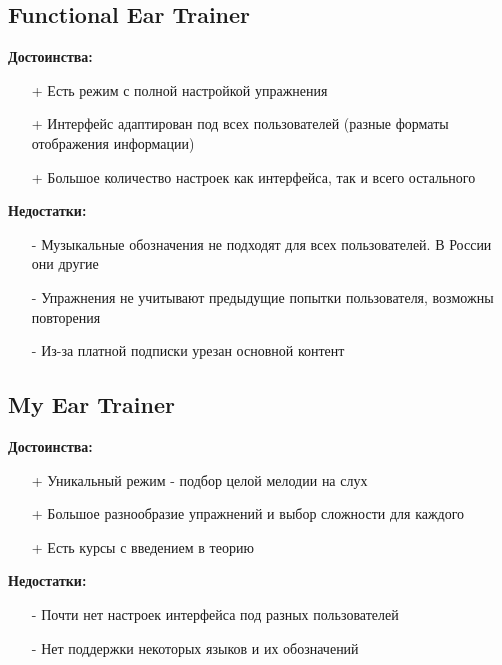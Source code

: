 \subsection[Functional Ear Trainer]{Functional Ear Trainer\cite{Apps2}}
\begin{minipage}[t]{0.45\textwidth}
\textbf{Достоинства:}
\begin{itemize}
  \item[+] Есть режим с полной настройкой упражнения
  \item[+] Интерфейс адаптирован под всех пользователей (разные форматы отображения информации)
  \item[+] Большое количество настроек как интерфейса, так и всего остального
\end{itemize}
\end{minipage}
\hfill
\begin{minipage}[t]{0.45\textwidth}
\textbf{Недостатки:}
\begin{itemize}
  \item[-] Музыкальные обозначения не подходят для всех пользователей. В России они другие
  \item[-] Упражнения не учитывают предыдущие попытки пользователя, возможны повторения
  \item[-] Из-за платной подписки урезан основной контент
\end{itemize}
\end{minipage}
\subsection[My Ear Trainer]{My Ear Trainer\cite{Apps3}}
\begin{minipage}[t]{0.45\textwidth}
\textbf{Достоинства:}
\begin{itemize}
  \item[+] Уникальный режим - подбор целой мелодии на слух
  \item[+] Большое разнообразие упражнений и выбор сложности для каждого
  \item[+] Есть курсы с введением в теорию	
\end{itemize}
\end{minipage}
\hfill
\begin{minipage}[t]{0.45\textwidth}
\textbf{Недостатки:}
\begin{itemize}
  \item[-] Почти нет настроек интерфейса под разных пользователей
  \item[-] Нет поддержки некоторых языков и их обозначений
\end{itemize}
\end{minipage}
